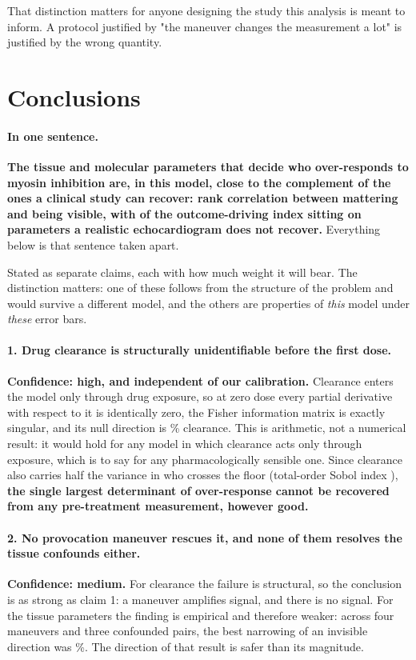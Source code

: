 \documentclass[11pt,a4paper]{article}
\newcommand{\claim}[1]{\textcolor{accent}{\textbf{#1}}}
\begin{document}
That distinction matters for anyone designing the study this analysis is meant to inform. A
protocol justified by "the maneuver changes the measurement a lot" is justified by the wrong
quantity.

\section{Conclusions}
\label{sec:conclusions}

\paragraph{In one sentence.} \claim{The tissue and molecular parameters that decide who
over-responds to myosin inhibition are, in this model, close to the complement of the ones a
clinical study can recover: rank correlation \inversionSpearman{} between mattering and being
visible, with \driverMassLost{} of the outcome-driving index sitting on parameters a realistic
echocardiogram does not recover.} Everything below is that sentence taken apart.

Stated as separate claims, each with how much weight it will bear. The distinction matters:
one of these follows from the structure of the problem and would survive a different model,
and the others are properties of \emph{this} model under \emph{these} error bars.

\paragraph{1. Drug clearance is structurally unidentifiable before the first dose.}
\claim{Confidence: high, and independent of our calibration.} Clearance enters the model only
through drug exposure, so at zero dose every partial derivative with respect to it is
identically zero, the Fisher information matrix is exactly singular, and its null direction
is \nullDirectionClearanceWeight\% clearance. This is arithmetic, not a numerical result: it
would hold for any model in which clearance acts only through exposure, which is to say for
any pharmacologically sensible one. Since clearance also carries half the
variance in who crosses the floor (total-order Sobol index \outcomeTopST), \claim{the single largest determinant of over-response
cannot be recovered from any pre-treatment measurement, however good.}

\paragraph{2. No provocation maneuver rescues it, and none of them resolves the tissue
confounds either.} \claim{Confidence: medium.} For clearance the failure is structural, so
the conclusion is as strong as claim 1: a maneuver amplifies signal, and there is no signal.
For the tissue parameters the finding is empirical and therefore weaker: across four
maneuvers and three confounded pairs, the best narrowing of an invisible direction was
\bestRidgeShrinkage\%. The direction of that result is safer than its magnitude.
\end{document}

